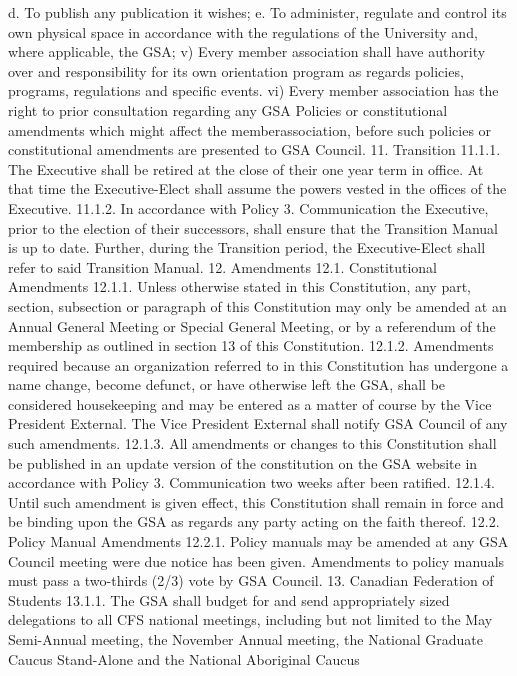 \documentclass{article}
\begin{document}
d. To publish any publication it wishes; 
e. To administer, regulate and control its own physical space in 
 accordance with the regulations of the University and, where 
 applicable, the GSA; 
v) Every member association shall have authority over and responsibility 
for its own orientation program as regards policies, programs, 
regulations and specific events. 
vi) Every member association has the right to prior consultation regarding 
any GSA Policies or constitutional amendments which might affect the 
memberassociation, before such policies or constitutional 
amendments are presented to GSA Council. 
11. Transition 
11.1.1. The Executive shall be retired at the close of their one year term in 
office. At that time the Executive-Elect shall assume the powers vested 
in the offices of the Executive. 
11.1.2. In accordance with Policy 3. Communication the Executive, prior 
to the election of their successors, shall ensure that the Transition 
Manual is up to date. Further, during the Transition period, the 
Executive-Elect shall refer to said Transition Manual. 
12. Amendments 
12.1. Constitutional Amendments 
12.1.1. Unless otherwise stated in this Constitution, any part, section, 
subsection or paragraph of this Constitution may only be amended at 
an Annual General Meeting or Special General Meeting, or by a 
referendum of the membership as outlined in section 13 of this 
Constitution. 
12.1.2. Amendments required because an organization referred to in this 
Constitution has undergone a name change, become defunct, or have 
otherwise left the GSA, shall be considered housekeeping and may be 
entered as a matter of course by the Vice President External. The Vice 
President External shall notify GSA Council of any such amendments. 
12.1.3. All amendments or changes to this Constitution shall be published 
in an update version of the constitution on the GSA website in 
accordance with Policy 3. Communication two weeks after been ratified. 
12.1.4. Until such amendment is given effect, this Constitution shall 
remain in force and be binding upon the GSA as regards any party 
acting on the faith thereof. 
12.2. Policy Manual Amendments 
12.2.1. Policy manuals may be amended at any GSA Council meeting were 
due notice has been given. Amendments to policy manuals must pass a 
two-thirds (2/3) vote by GSA Council. 
13. Canadian Federation of Students 
13.1.1. The GSA shall budget for and send appropriately sized delegations 
to all CFS national meetings, including but not limited to the May 
Semi-Annual meeting, the November Annual meeting, the National 
Graduate Caucus Stand-Alone and the National Aboriginal Caucus 
\end{document}
